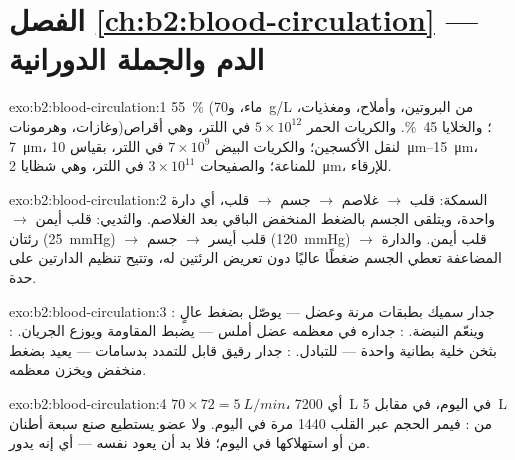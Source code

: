 \section*{الفصل \ref{ch:b2:blood-circulation} --- الدم والجملة الدورانية}

\begin{solution}{exo:b2:blood-circulation:1}
 \qty{55}{\%} (ماء، و\qty{70}{g/L} من البروتين، وأملاح،
ومغذيات، وغازات، وهرمونات)؛ والخلايا \qty{45}{\%}. والكريات الحمر $5\times
10^{12}$ في اللتر، وهي أقراص \qty{7}{\micro m}، لنقل الأكسجين؛ والكريات البيض
$7\times 10^{9}$ في اللتر، بقياس \qtyrange{10}{15}{\micro m}، للمناعة؛ والصفيحات
$3\times 10^{11}$ في اللتر، وهي شظايا \qty{2}{\micro m}، للإرقاء.
\end{solution}

\begin{solution}{exo:b2:blood-circulation:2}
السمكة: قلب $\to$ غلاصم $\to$ جسم $\to$ قلب، أي دارة واحدة، ويتلقى
الجسم  بالضغط المنخفض الباقي بعد الغلاصم. والثديي:
قلب أيمن $\to$ رئتان (\qty{25}{mmHg}) $\to$ قلب أيسر $\to$ جسم
(\qty{120}{mmHg}) $\to$ قلب أيمن. والدارة المضاعفة تعطي
الجسم ضغطًا عاليًا دون تعريض الرئتين له، وتتيح تنظيم
الدارتين على حدة.
\end{solution}

\begin{solution}{exo:b2:blood-circulation:3}
: جدار سميك بطبقات مرنة وعضل --- يوصّل 
بضغط عالٍ وينعّم النبضة. : جداره في معظمه
عضل أملس --- يضبط المقاومة ويوزع الجريان. :
بثخن خلية بطانية واحدة --- للتبادل. : جدار رقيق قابل
للتمدد بدسامات --- يعيد  بضغط منخفض ويخزن معظمه.
\end{solution}

\begin{solution}{exo:b2:blood-circulation:4}
$70\times 72 = \qty{5}{L/min}$، أي \qty{7200}{L} في اليوم، في مقابل
\qty{5}{L} من : فيمر الحجم عبر القلب \num{1440}
مرة في اليوم. ولا عضو يستطيع صنع سبعة أطنان من  أو استهلاكها في
اليوم؛ فلا بد أن يعود  نفسه --- أي إنه يدور.
\end{solution}

